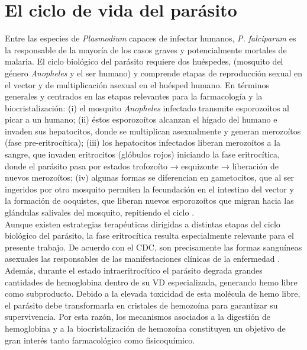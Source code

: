 \documentclass[12pt,letterpaper,oneside]{report}
\begin{document}
\section{El ciclo de vida del parásito}

Entre las especies de \textit{Plasmodium} capaces de infectar humanos, \textit{P. falciparum} es la responsable de la mayoría de los casos graves y potencialmente mortales de malaria. El ciclo biológico del parásito requiere dos huéspedes, (mosquito del género \textit{Anopheles} y el ser humano) y comprende etapas de reproducción sexual en el vector y de multiplicación asexual en el huésped humano. En términos generales y centrados en las etapas relevantes para la farmacología y la biocristalización: (i)
 el mosquito \textit{Anopheles} infectado transmite esporozoítos al picar a un humano; (ii) éstos esporozoítos alcanzan el hígado del humano e invaden sus hepatocitos, donde se multiplican asexualmente y generan merozoítos (fase pre-eritrocítica); (iii) los hepatocitos infectados liberan merozoítos a la sangre, que invaden eritrocitos (glóbulos rojos) iniciando la fase eritrocítica, donde el parásito pasa por estados trofozoíto → esquizonte → liberación de nuevos merozoítos; (iv) algunas formas se diferencian en gametocitos, que al ser ingeridos por otro mosquito permiten la fecundación en el intestino del vector y la formación de ooquistes, que liberan nuevos esporozoítos que migran hacia las glándulas salivales del mosquito, repitiendo el ciclo \cite{CDCMalariaLifeCycle}.\\ 

Aunque existen estrategias terapéuticas dirigidas a distintas etapas del ciclo biológico del parásito, la fase eritrocítica resulta especialmente relevante para el presente trabajo. De acuerdo con el CDC, son precisamente las formas sanguíneas asexuales las responsables de las manifestaciones clínicas de la enfermedad \cite{CDCMalariaLifeCycle}. Además, durante el estado intraeritrocítico el parásito degrada grandes cantidades de hemoglobina dentro de su VD especializada, generando hemo libre como subproducto. Debido a la elevada toxicidad de esta molécula de hemo libre, el parásito debe transformarla en cristales de hemozoína para garantizar su supervivencia. Por esta razón, los mecanismos asociados a la digestión de hemoglobina y a la biocristalización de hemozoína constituyen un objetivo de gran interés tanto farmacológico como fisicoquímico.\\

\end{document}
